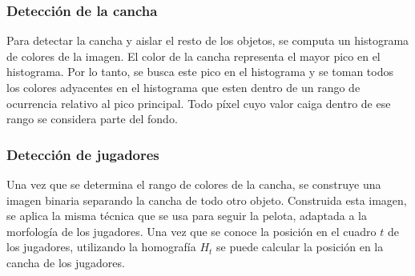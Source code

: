 \subsubsection*{Detección de la cancha}

Para detectar la cancha y aislar el resto de los objetos, se computa un histograma de colores de la imagen.
El color de la cancha representa el mayor pico en el histograma.
Por lo tanto, se busca este pico en el histograma y se toman todos los colores adyacentes en el histograma
que esten dentro de un rango de ocurrencia relativo al pico principal.
Todo píxel cuyo valor caiga dentro de ese rango se considera parte del fondo.

\subsubsection*{Detección de jugadores}

Una vez que se determina el rango de colores de la cancha, se construye una imagen binaria separando la cancha de todo otro objeto.
Construida esta imagen, se aplica la misma técnica que se usa para seguir la pelota, adaptada a la morfología de los jugadores.
Una vez que se conoce la posición en el cuadro $t$ de los jugadores, utilizando la homografía $H_t$ se puede calcular la posición
en la cancha de los jugadores.
